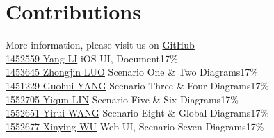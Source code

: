 \documentclass[12pt]{scrreprt}
\begin{document}
\chapter{Contributions}
More information, please visit us on \href{https://github.com/zjzsliyang/OnionExpress}{GitHub}
\vspace{3mm}\\
\href{https://github.com/zjzsliyang}{{\color{blue}1452559 Yang LI}} \hspace{17mm} iOS UI, Document\hfill 17\%\\
\href{https://github.com/tjluozhongjin}{{\color{blue}1453645 Zhongjin LUO}} \hspace{5mm} Scenario One \& Two Diagrams\hfill 17\%\\
\href{https://github.com/Yghifi}{{\color{blue}1451229 Guohui YANG}} \hspace{4.5mm} Scenario Three \& Four Diagrams\hfill 17\%\\
\href{https://github.com/lyqun}{{\color{blue}1552705 Yiqun LIN}} \hspace{11mm} Scenario Five \& Six Diagrams\hfill 17\%\\
\href{https://github.com/Charon0622}{{\color{blue}1552651 Yirui WANG}} \hspace{7mm} Scenario Eight \& Global Diagrams\hfill 17\%\\
\href{https://github.com/CandiceGemini}{{\color{blue}1552677 Xinying WU}} \hspace{8mm} Web UI, Scenario Seven Diagrams\hfill 17\%
\end{document}
